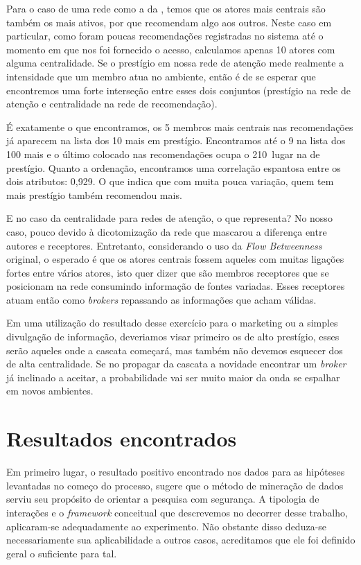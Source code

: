Para o caso de uma rede como a da , temos que os atores
mais centrais são também os mais ativos, por que recomendam algo aos outros.
Neste caso em particular, como foram poucas recomendações registradas no sistema
até o momento em que nos foi fornecido o acesso, calculamos apenas 10 atores com
alguma centralidade. Se o prestígio em nossa rede de atenção mede realmente a
intensidade que um membro atua no ambiente, então é de se esperar que
encontremos uma forte interseção entre esses dois conjuntos (prestígio na rede
de atenção e centralidade na rede de recomendação).

É exatamente o que encontramos, os 5 membros mais centrais nas recomendações já
aparecem na lista dos 10 mais em prestígio. Encontramos até o 9 na  lista dos 100
mais e o último colocado nas recomendações ocupa o 210\textordmasculine~lugar
na de prestígio. Quanto a ordenação, encontramos uma correlação espantosa entre os
dois atributos: 0,929. O que indica que com muita pouca variação, quem tem mais
prestígio também recomendou mais.

E no caso da centralidade para redes de atenção, o que representa? No nosso
caso, pouco devido à dicotomização da rede que mascarou a diferença entre
autores e receptores. Entretanto, considerando o uso da \emph{Flow Betweenness}
original, o esperado é que os atores centrais fossem aqueles com muitas ligações
fortes entre vários atores, isto quer dizer que são membros receptores que se
posicionam na rede consumindo informação de fontes variadas. Esses receptores
atuam então como \emph{brokers} repassando as informações que acham válidas. 

Em uma utilização do resultado desse exercício para o marketing ou a simples
divulgação de informação, deveriamos visar primeiro os de alto prestígio, esses
serão aqueles onde a cascata começará, mas também não devemos esquecer dos de
alta centralidade. Se no propagar da cascata a novidade encontrar um
\emph{broker} já inclinado a aceitar, a probabilidade vai ser muito maior da
onda se espalhar em novos ambientes.

\section{Resultados encontrados}
\label{ap:sec:resultados}

Em primeiro lugar, o resultado positivo encontrado nos dados para as hipóteses
levantadas no começo do processo, sugere que o método de mineração de dados
serviu seu propósito de orientar a pesquisa com segurança. A tipologia de
interações e o \emph{framework} conceitual que descrevemos no decorrer desse
trabalho, aplicaram-se adequadamente ao experimento. Não obstante disso deduza-se
necessariamente sua aplicabilidade a outros casos, acreditamos que ele foi
definido geral o suficiente para tal.

